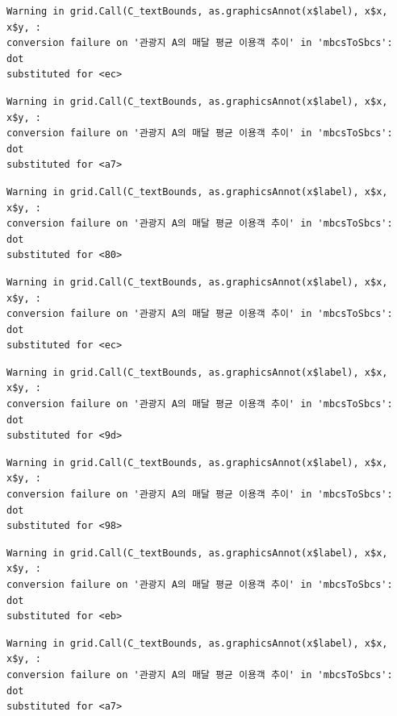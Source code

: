 \documentclass[
  letterpaper,
  DIV=11,
  numbers=noendperiod]{scrreprt}
\begin{document}
\begin{verbatim}
Warning in grid.Call(C_textBounds, as.graphicsAnnot(x$label), x$x, x$y, :
conversion failure on '관광지 A의 매달 평균 이용객 추이' in 'mbcsToSbcs': dot
substituted for <ec>
\end{verbatim}

\begin{verbatim}
Warning in grid.Call(C_textBounds, as.graphicsAnnot(x$label), x$x, x$y, :
conversion failure on '관광지 A의 매달 평균 이용객 추이' in 'mbcsToSbcs': dot
substituted for <a7>
\end{verbatim}

\begin{verbatim}
Warning in grid.Call(C_textBounds, as.graphicsAnnot(x$label), x$x, x$y, :
conversion failure on '관광지 A의 매달 평균 이용객 추이' in 'mbcsToSbcs': dot
substituted for <80>
\end{verbatim}

\begin{verbatim}
Warning in grid.Call(C_textBounds, as.graphicsAnnot(x$label), x$x, x$y, :
conversion failure on '관광지 A의 매달 평균 이용객 추이' in 'mbcsToSbcs': dot
substituted for <ec>
\end{verbatim}

\begin{verbatim}
Warning in grid.Call(C_textBounds, as.graphicsAnnot(x$label), x$x, x$y, :
conversion failure on '관광지 A의 매달 평균 이용객 추이' in 'mbcsToSbcs': dot
substituted for <9d>
\end{verbatim}

\begin{verbatim}
Warning in grid.Call(C_textBounds, as.graphicsAnnot(x$label), x$x, x$y, :
conversion failure on '관광지 A의 매달 평균 이용객 추이' in 'mbcsToSbcs': dot
substituted for <98>
\end{verbatim}

\begin{verbatim}
Warning in grid.Call(C_textBounds, as.graphicsAnnot(x$label), x$x, x$y, :
conversion failure on '관광지 A의 매달 평균 이용객 추이' in 'mbcsToSbcs': dot
substituted for <eb>
\end{verbatim}

\begin{verbatim}
Warning in grid.Call(C_textBounds, as.graphicsAnnot(x$label), x$x, x$y, :
conversion failure on '관광지 A의 매달 평균 이용객 추이' in 'mbcsToSbcs': dot
substituted for <a7>
\end{verbatim}
\end{document}
